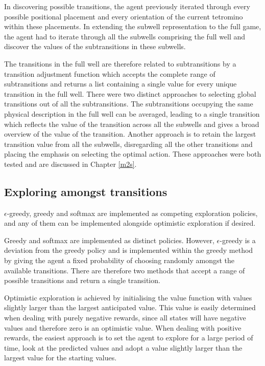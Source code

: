 \documentclass{rucsthesis}
\begin{document}
In discovering possible transitions, the agent previously iterated through every possible positional placement and every orientation of the current tetromino within these placements. In extending the subwell representation to the full game, the agent had to iterate through all the subwells comprising the full well and discover the values of the subtransitions in these subwells. 

The transitions in the full well are therefore related to subtransitions by a transition adjustment function which accepts the complete range of subtransitions and returns a list containing a single value for every unique transition in the full well. There were two distinct approaches to selecting global transitions out of all the subtransitions. The subtransitions occupying the same physical description in the full well can be averaged, leading to a single transition which reflects the value of the transition across all the subwells and gives a broad overview of the value of the transition. Another approach is to retain the largest transition value from all the subwells, disregarding all the other transitions and placing the emphasis on selecting the optimal action. These approaches were both tested and are discussed in Chapter \ref{m2s}.

\subsection{Exploring amongst transitions}

$\epsilon$-greedy, greedy and softmax are implemented as competing exploration policies, and any of them can be implemented alongside optimistic exploration if desired.

Greedy and softmax are implemented as distinct policies. However, $\epsilon$-greedy is a deviation from the greedy policy and is implemented within the greedy method by giving the agent a fixed probability of choosing randomly amongst the available transitions. There are therefore two methods that accept a range of possible transitions and return a single transition.

Optimistic exploration is achieved by initialising the value function with values slightly larger than the largest anticipated value. This value is easily determined when dealing with purely negative rewards, since all states will have negative values and therefore zero is an optimistic value. When dealing with positive rewards, the easiest approach is to set the agent to explore for a large period of time, look at the predicted values and adopt a value slightly larger than the largest value for the starting values.
\end{document}
